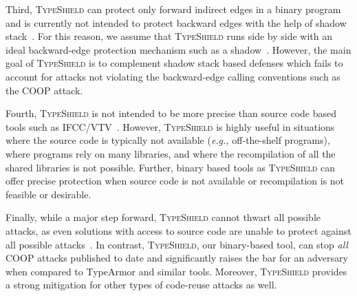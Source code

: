 Third, \textsc{TypeShield} can protect only forward indirect edges in a binary program and is currently not intended to protect backward
edges with the help of shadow stack~\cite{dang:asiaccs}. For this reason, we assume that \textsc{TypeShield} runs side by side with an 
ideal backward-edge protection mechanism such as a shadow~\cite{conti:ccs}. However, the main goal of \textsc{TypeShield} is to complement 
shadow stack based defenses which fails to account for attacks not violating the backward-edge calling conventions such as the COOP attack.

Fourth, \textsc{TypeShield} is not intended to be more precise than source code based tools such as IFCC/VTV~\cite{vtv:tice}. However, 
\textsc{TypeShield} is highly useful in situations where the source code is typically not available (\textit{e.g.,} off-the-shelf programs), 
where programs rely on many libraries, and where the recompilation of all the shared libraries is not possible. 
Further, binary based tools as \textsc{TypeShield} can offer precise protection when source code is not available or 
recompilation is not feasible or desirable.

Finally, while a major step forward, \textsc{TypeShield} cannot thwart all possible attacks, as even solutions with access to source 
code are unable to protect against all possible attacks~\cite{carlini:bending}. In contrast, \textsc{TypeShield}, our binary-based tool, 
can stop \textit{all} COOP attacks published to date and significantly raises the bar for an adversary when compared to
TypeArmor and similar tools. Moreover, \textsc{TypeShield} provides a strong mitigation for other types of code-reuse attacks as well.
